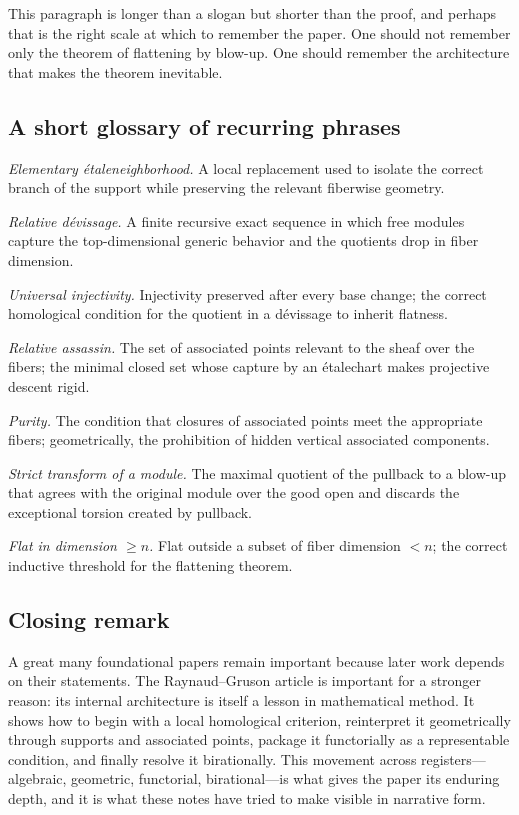 \documentclass[11pt,oneside]{article}
\newcommand{\etale}{\'etale}
\begin{document}
This paragraph is longer than a slogan but shorter than the proof, and perhaps that is the right scale at which to remember the paper.  One should not remember only the theorem of flattening by blow-up.  One should remember the architecture that makes the theorem inevitable.

\subsection*{A short glossary of recurring phrases}

\emph{Elementary \etale neighborhood.}  A local replacement used to isolate the correct branch of the support while preserving the relevant fiberwise geometry.

\emph{Relative d\'evissage.}  A finite recursive exact sequence in which free modules capture the top-dimensional generic behavior and the quotients drop in fiber dimension.

\emph{Universal injectivity.}  Injectivity preserved after every base change; the correct homological condition for the quotient in a d\'evissage to inherit flatness.

\emph{Relative assassin.}  The set of associated points relevant to the sheaf over the fibers; the minimal closed set whose capture by an \etale chart makes projective descent rigid.

\emph{Purity.}  The condition that closures of associated points meet the appropriate fibers; geometrically, the prohibition of hidden vertical associated components.

\emph{Strict transform of a module.}  The maximal quotient of the pullback to a blow-up that agrees with the original module over the good open and discards the exceptional torsion created by pullback.

\emph{Flat in dimension $\ge n$.}  Flat outside a subset of fiber dimension $<n$; the correct inductive threshold for the flattening theorem.

\subsection*{Closing remark}

A great many foundational papers remain important because later work depends on their statements.  The Raynaud--Gruson article is important for a stronger reason: its internal architecture is itself a lesson in mathematical method.  It shows how to begin with a local homological criterion, reinterpret it geometrically through supports and associated points, package it functorially as a representable condition, and finally resolve it birationally.  This movement across registers---algebraic, geometric, functorial, birational---is what gives the paper its enduring depth, and it is what these notes have tried to make visible in narrative form.
\end{document}
